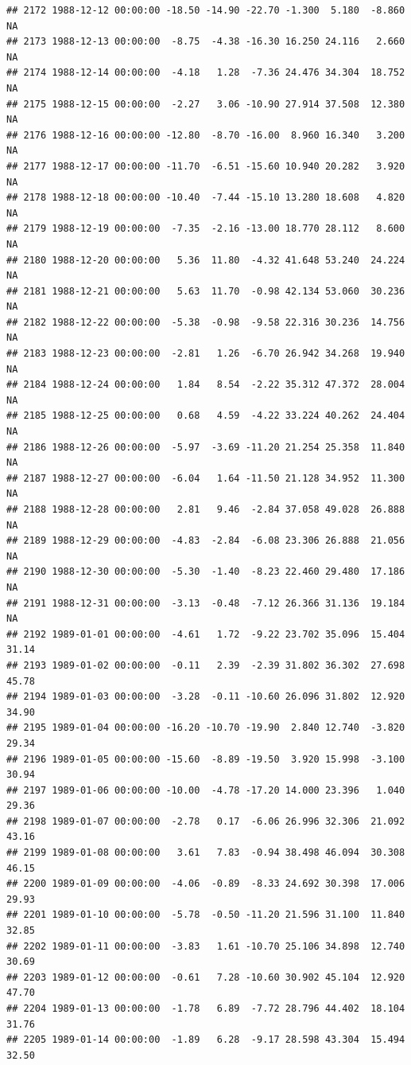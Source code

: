 \documentclass{article}\usepackage{graphicx, color}
\makeatletter
\newenvironment{kframe}{%
 \def\at@end@of@kframe{}%
 \ifinner\ifhmode%
  \def\at@end@of@kframe{\end{minipage}}%
  \begin{minipage}{\columnwidth}%
 \fi\fi%
 \def\FrameCommand##1{\hskip\@totalleftmargin \hskip-\fboxsep
 \colorbox{shadecolor}{##1}\hskip-\fboxsep
     \hskip-\linewidth \hskip-\@totalleftmargin \hskip\columnwidth}%
 \MakeFramed {\advance\hsize-\width
   \@totalleftmargin\z@ \linewidth\hsize
   \@setminipage}}%
 {\par\unskip\endMakeFramed%
 \at@end@of@kframe}
\newenvironment{knitrout}{}{} %
\makeatother
\begin{document}
\begin{knitrout}
\begin{kframe}
\begin{verbatim}
## 2172 1988-12-12 00:00:00 -18.50 -14.90 -22.70 -1.300  5.180  -8.860     NA
## 2173 1988-12-13 00:00:00  -8.75  -4.38 -16.30 16.250 24.116   2.660     NA
## 2174 1988-12-14 00:00:00  -4.18   1.28  -7.36 24.476 34.304  18.752     NA
## 2175 1988-12-15 00:00:00  -2.27   3.06 -10.90 27.914 37.508  12.380     NA
## 2176 1988-12-16 00:00:00 -12.80  -8.70 -16.00  8.960 16.340   3.200     NA
## 2177 1988-12-17 00:00:00 -11.70  -6.51 -15.60 10.940 20.282   3.920     NA
## 2178 1988-12-18 00:00:00 -10.40  -7.44 -15.10 13.280 18.608   4.820     NA
## 2179 1988-12-19 00:00:00  -7.35  -2.16 -13.00 18.770 28.112   8.600     NA
## 2180 1988-12-20 00:00:00   5.36  11.80  -4.32 41.648 53.240  24.224     NA
## 2181 1988-12-21 00:00:00   5.63  11.70  -0.98 42.134 53.060  30.236     NA
## 2182 1988-12-22 00:00:00  -5.38  -0.98  -9.58 22.316 30.236  14.756     NA
## 2183 1988-12-23 00:00:00  -2.81   1.26  -6.70 26.942 34.268  19.940     NA
## 2184 1988-12-24 00:00:00   1.84   8.54  -2.22 35.312 47.372  28.004     NA
## 2185 1988-12-25 00:00:00   0.68   4.59  -4.22 33.224 40.262  24.404     NA
## 2186 1988-12-26 00:00:00  -5.97  -3.69 -11.20 21.254 25.358  11.840     NA
## 2187 1988-12-27 00:00:00  -6.04   1.64 -11.50 21.128 34.952  11.300     NA
## 2188 1988-12-28 00:00:00   2.81   9.46  -2.84 37.058 49.028  26.888     NA
## 2189 1988-12-29 00:00:00  -4.83  -2.84  -6.08 23.306 26.888  21.056     NA
## 2190 1988-12-30 00:00:00  -5.30  -1.40  -8.23 22.460 29.480  17.186     NA
## 2191 1988-12-31 00:00:00  -3.13  -0.48  -7.12 26.366 31.136  19.184     NA
## 2192 1989-01-01 00:00:00  -4.61   1.72  -9.22 23.702 35.096  15.404  31.14
## 2193 1989-01-02 00:00:00  -0.11   2.39  -2.39 31.802 36.302  27.698  45.78
## 2194 1989-01-03 00:00:00  -3.28  -0.11 -10.60 26.096 31.802  12.920  34.90
## 2195 1989-01-04 00:00:00 -16.20 -10.70 -19.90  2.840 12.740  -3.820  29.34
## 2196 1989-01-05 00:00:00 -15.60  -8.89 -19.50  3.920 15.998  -3.100  30.94
## 2197 1989-01-06 00:00:00 -10.00  -4.78 -17.20 14.000 23.396   1.040  29.36
## 2198 1989-01-07 00:00:00  -2.78   0.17  -6.06 26.996 32.306  21.092  43.16
## 2199 1989-01-08 00:00:00   3.61   7.83  -0.94 38.498 46.094  30.308  46.15
## 2200 1989-01-09 00:00:00  -4.06  -0.89  -8.33 24.692 30.398  17.006  29.93
## 2201 1989-01-10 00:00:00  -5.78  -0.50 -11.20 21.596 31.100  11.840  32.85
## 2202 1989-01-11 00:00:00  -3.83   1.61 -10.70 25.106 34.898  12.740  30.69
## 2203 1989-01-12 00:00:00  -0.61   7.28 -10.60 30.902 45.104  12.920  47.70
## 2204 1989-01-13 00:00:00  -1.78   6.89  -7.72 28.796 44.402  18.104  31.76
## 2205 1989-01-14 00:00:00  -1.89   6.28  -9.17 28.598 43.304  15.494  32.50

\end{verbatim}
\end{kframe}
\end{knitrout}
\end{document}
